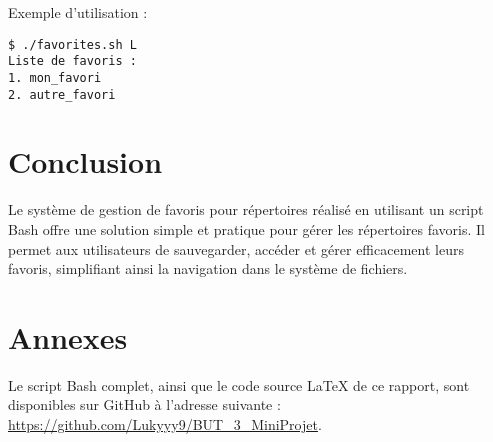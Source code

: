 \documentclass[a4paper, 12pt]{article}
\begin{document}
Exemple d'utilisation :
\begin{lstlisting}[style=mystyle]
$ ./favorites.sh L
Liste de favoris :
1. mon_favori
2. autre_favori
\end{lstlisting}

\section{Conclusion}
Le système de gestion de favoris pour répertoires réalisé en utilisant un script Bash offre une solution simple et pratique pour gérer les répertoires favoris. Il permet aux utilisateurs de sauvegarder, accéder et gérer efficacement leurs favoris, simplifiant ainsi la navigation dans le système de fichiers.

\section{Annexes}
Le script Bash complet, ainsi que le code source LaTeX de ce rapport, sont disponibles sur GitHub à l'adresse suivante : \url{https://github.com/Lukyyy9/BUT_3_MiniProjet}.
\end{document}

